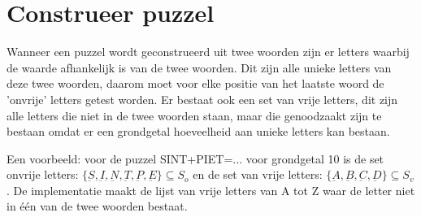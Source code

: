 \documentclass[twocolumn,10pt]{article}
\begin{document}
\begin{table}[h]
    \centering
    \caption{Resultaten van verschillende puzzels.}
\end{table}
\FloatBarrier

\section*{Construeer puzzel}
Wanneer een puzzel wordt geconstrueerd uit twee woorden zijn er letters waarbij de waarde afhankelijk is van de twee woorden. Dit zijn alle unieke letters van deze twee woorden, daarom moet voor elke positie van het laatste woord de 'onvrije' letters getest worden. Er bestaat ook een set van vrije letters, dit zijn alle letters die niet in de twee woorden staan, maar die genoodzaakt zijn te bestaan omdat er een grondgetal hoeveelheid aan unieke letters kan bestaan.

Een voorbeeld: voor de puzzel SINT+PIET=... voor grondgetal 10 is de set onvrije letters: $\{\underbar{S}, \underbar{I}, \underbar{N}, \underbar{T}, \underbar{P}, \underbar{E}\} \subseteq S_o$ en de set van vrije letters: $\{ \underbar{A}, \underbar{B}, \underbar{C}, \underbar{D} \} \subseteq S_v$. De implementatie maakt de lijst van vrije letters van A tot Z waar de letter niet in \'e\'en van de twee woorden bestaat.
\end{document}
